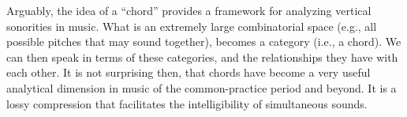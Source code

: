 

Arguably, the idea of a ``chord'' provides a framework for analyzing vertical sonorities in music. What is an extremely large combinatorial space (e.g., all possible pitches that may sound together), becomes a category (i.e., a chord). We can then speak in terms of these categories, and the relationships they have with each other. It is not surprising then, that chords have become a very useful analytical dimension in music of the common-practice period and beyond. It is a lossy compression that facilitates the intelligibility of simultaneous sounds.

